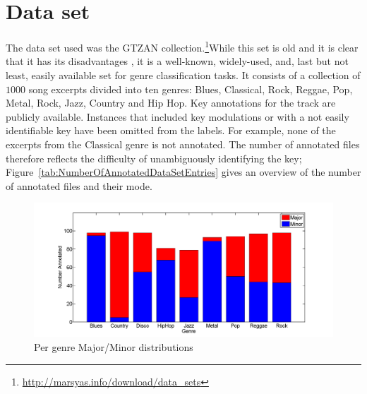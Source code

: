 \documentclass{article}
\begin{document}
\section{Data set}\label{sec:dataset}
The data set used was the GTZAN collection.\footnote{\url{http://marsyas.info/download/data_sets}}While this set is old and it is clear that it has its disadvantages \cite{sturm_analysis_2012}, it is a well-known, widely-used, and, last but not least, easily available set for genre classification tasks. It consists of a collection of $1000$ song excerpts divided into ten genres: Blues, Classical, Rock, Reggae, Pop, Metal, Rock, Jazz, Country and Hip Hop. 
Key annotations for the track are publicly available. %
Instances that included key modulations or with a not easily identifiable key have been omitted from the labels. For example, none of the excerpts from the Classical genre is not annotated. 
The number of annotated files therefore reflects the difficulty of unambiguously identifying the key; Figure~\ref{tab:NumberOfAnnotatedDataSetEntries} gives an overview of the number of annotated files and their mode. 

\begin{figure}[tb]\label{tab:NumberOfAnnotatedDataSetEntries}
    \includegraphics[scale=.2]{graph/annotated}
	\caption{Per genre Major/Minor distributions}
	\label{fig:confPC+MFCC}
\end{figure}
\end{document}
